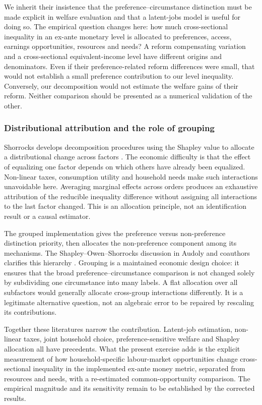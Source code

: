 \documentclass[11pt,a4paper]{article}
\begin{document}
We inherit their insistence that the preference--circumstance distinction must be made explicit in welfare evaluation and that a latent-jobs model is useful for doing so. The empirical question changes here: how much cross-sectional inequality in an ex-ante monetary level is allocated to preferences, access, earnings opportunities, resources and needs? A reform compensating variation and a cross-sectional equivalent-income level have different origins and denominators. Even if their preference-related reform differences were small, that would not establish a small preference contribution to our level inequality. Conversely, our decomposition would not estimate the welfare gains of their reform. Neither comparison should be presented as a numerical validation of the other.

\subsubsection{Distributional attribution and the role of grouping}\label{distributional-attribution-and-the-role-of-grouping}

Shorrocks develops decomposition procedures using the Shapley value to allocate a distributional change across factors \citep{shorrocks2013}. The economic difficulty is that the effect of equalizing one factor depends on which others have already been equalized. Non-linear taxes, consumption utility and household needs make such interactions unavoidable here. Averaging marginal effects across orders produces an exhaustive attribution of the reducible inequality difference without assigning all interactions to the last factor changed. This is an allocation principle, not an identification result or a causal estimator.

The grouped implementation gives the preference versus non-preference distinction priority, then allocates the non-preference component among its mechanisms. The Shapley--Owen--Shorrocks discussion in Audoly and coauthors clarifies this hierarchy \citep{audoly2025}. Grouping is a maintained economic design choice: it ensures that the broad preference--circumstance comparison is not changed solely by subdividing one circumstance into many labels. A flat allocation over all subfactors would generally allocate cross-group interactions differently. It is a legitimate alternative question, not an algebraic error to be repaired by rescaling its contributions.

Together these literatures narrow the contribution. Latent-job estimation, non-linear taxes, joint household choice, preference-sensitive welfare and Shapley allocation all have precedents. What the present exercise adds is the explicit measurement of how household-specific labour-market opportunities change cross-sectional inequality in the implemented ex-ante money metric, separated from resources and needs, with a re-estimated common-opportunity comparison. The empirical magnitude and its sensitivity remain to be established by the corrected results.
\end{document}
